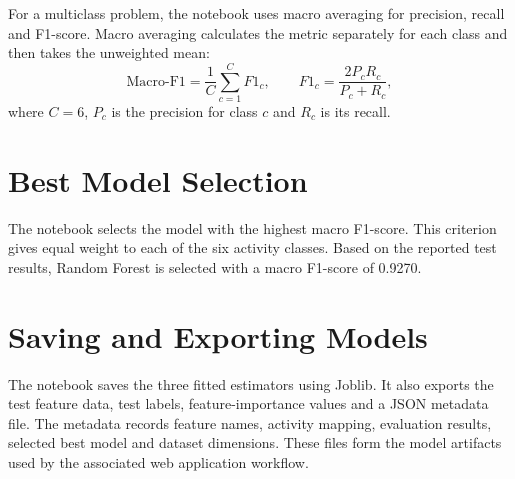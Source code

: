 For a multiclass problem, the notebook uses macro averaging for precision, recall and F1-score. Macro averaging calculates the metric separately for each class and then takes the unweighted mean:
\[
\text{Macro-F1} = \frac{1}{C}\sum_{c=1}^{C}F1_c,
\qquad
F1_c = \frac{2P_cR_c}{P_c+R_c},
\]
where $C=6$, $P_c$ is the precision for class $c$ and $R_c$ is its recall.

\section{Best Model Selection}
The notebook selects the model with the highest macro F1-score. This criterion gives equal weight to each of the six activity classes. Based on the reported test results, Random Forest is selected with a macro F1-score of 0.9270.

\section{Saving and Exporting Models}
The notebook saves the three fitted estimators using Joblib. It also exports the test feature data, test labels, feature-importance values and a JSON metadata file. The metadata records feature names, activity mapping, evaluation results, selected best model and dataset dimensions. These files form the model artifacts used by the associated web application workflow.
